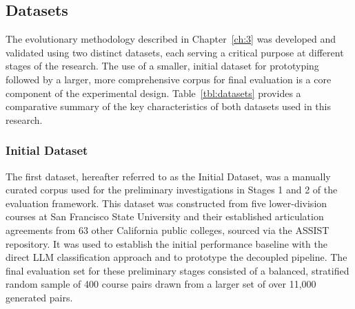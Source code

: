 \subsection{Datasets}
The evolutionary methodology described in Chapter~\ref{ch:3} was developed and validated using two distinct datasets, each serving a critical purpose at different stages of the research. The use of a smaller, initial dataset for prototyping followed by a larger, more comprehensive corpus for final evaluation is a core component of the experimental design. Table~\ref{tbl:datasets} provides a comparative summary of the key characteristics of both datasets used in this research.
\begin{table}[!tb]
    \captionsetup{skip=5pt}
    \centering
    \caption{Summary of Datasets Used in Evaluation}
    \label{tbl:datasets}
\end{table}
\subsubsection{Initial Dataset}
The first dataset, hereafter referred to as the Initial Dataset, was a manually curated corpus used for the preliminary investigations in Stages 1 and 2 of the evaluation framework. This dataset was constructed from five lower-division courses at San Francisco State University and their established articulation agreements from 63 other California public colleges, sourced via the ASSIST repository. It was used to establish the initial performance baseline with the direct LLM classification approach and to prototype the decoupled pipeline. The final evaluation set for these preliminary stages consisted of a balanced, stratified random sample of 400 course pairs drawn from a larger set of over 11,000 generated pairs.

